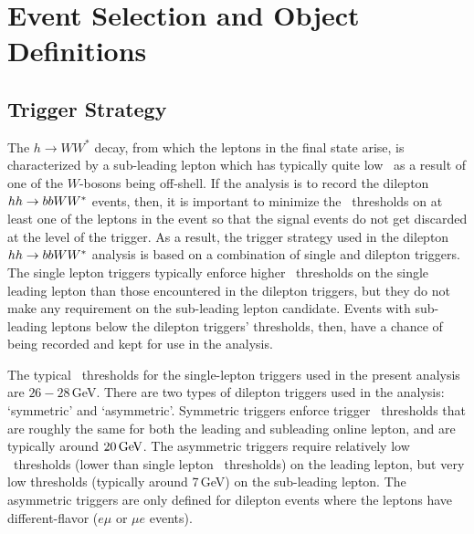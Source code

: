 \section{Event Selection and Object Definitions}
\label{sec:hh_event_selection}

%
%
\subsection{Trigger Strategy}
\label{sec:hh_trigger_strategy}

The $h \rightarrow WW^*$ decay, from which the leptons in the final state arise,
is characterized by a sub-leading lepton which has typically quite low \pT~as a result
of one of the $W$-bosons being off-shell.
If the analysis is to record the dilepton $hh \rightarrow bbWW^*$ events, then, it is important
to minimize the \pT~thresholds on at least one of the leptons in the event so that the
signal events do not get discarded at the level of the trigger.
As a result, the trigger strategy used in the dilepton $hh \rightarrow bbWW^*$ analysis is based
on a combination of single and dilepton triggers.
The single lepton triggers typically enforce higher \pT~thresholds on the single leading lepton
than those encountered in the dilepton triggers, but they do not make any requirement on the sub-leading
lepton candidate.
Events with sub-leading leptons below the dilepton triggers' thresholds, then, have a chance of
being recorded and kept for use in the analysis.

The typical \pT~thresholds for the single-lepton triggers used in the present analysis are $26-28$\,GeV.
There are two types of dilepton triggers used in the analysis: `symmetric' and `asymmetric'.
Symmetric triggers enforce trigger \pT~thresholds that are roughly the same for both the leading and subleading
online lepton, and are typically around $20\,\text{Ge\kern -0.1em V}$.
The asymmetric triggers require relatively low \pT~thresholds (lower than single lepton \pT~thresholds)
on the leading lepton, but very low thresholds (typically around 7\,GeV) on the sub-leading lepton.
The asymmetric triggers are only defined for dilepton events where the leptons have different-flavor ($e \mu$ or $\mu e$ events).

